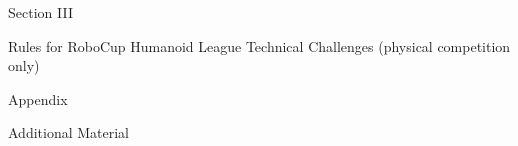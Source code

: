 \documentclass[a4paper]{article}
\begin{document}
    



\clearpage

\begin{center}
\Huge\bfseries{
\vspace*{3cm}
Section III

\vspace*{2cm}

Rules for RoboCup Humanoid League Technical Challenges (physical competition only)}
\end{center}












\clearpage

\begin{center}
  \Huge\bfseries{
    \vspace*{3cm}
    Appendix

    \vspace*{2cm}

    Additional Material}
  
\end{center}



\end{document}
